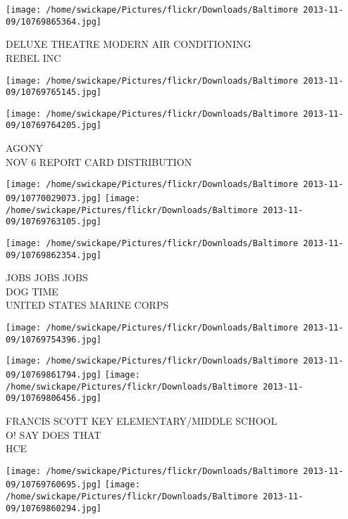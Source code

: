 \documentclass[10pt,letterpaper]{article}
\begin{document}
\vspace{0.25in}
\texttt{[image: /home/swickape/Pictures/flickr/Downloads/Baltimore 2013-11-09/10769865364.jpg]}

DELUXE THEATRE MODERN AIR CONDITIONING\\
REBEL INC\\
\pagebreak

\texttt{[image: /home/swickape/Pictures/flickr/Downloads/Baltimore 2013-11-09/10769765145.jpg]}

\vspace{0.25in}
\texttt{[image: /home/swickape/Pictures/flickr/Downloads/Baltimore 2013-11-09/10769764205.jpg]}

AGONY\\
NOV 6 REPORT CARD DISTRIBUTION\\
\pagebreak

\texttt{[image: /home/swickape/Pictures/flickr/Downloads/Baltimore 2013-11-09/10770029073.jpg]}
\texttt{[image: /home/swickape/Pictures/flickr/Downloads/Baltimore 2013-11-09/10769763105.jpg]}

\vspace{0.25in}
\texttt{[image: /home/swickape/Pictures/flickr/Downloads/Baltimore 2013-11-09/10769862354.jpg]}

JOBS JOBS JOBS\\
DOG TIME\\
UNITED STATES MARINE CORPS\\
\pagebreak

\texttt{[image: /home/swickape/Pictures/flickr/Downloads/Baltimore 2013-11-09/10769754396.jpg]}

\vspace{0.25in}
\texttt{[image: /home/swickape/Pictures/flickr/Downloads/Baltimore 2013-11-09/10769861794.jpg]}
\texttt{[image: /home/swickape/Pictures/flickr/Downloads/Baltimore 2013-11-09/10769806456.jpg]}

FRANCIS SCOTT KEY ELEMENTARY/MIDDLE SCHOOL\\
O! SAY DOES THAT\\
HCE\\
\pagebreak

\texttt{[image: /home/swickape/Pictures/flickr/Downloads/Baltimore 2013-11-09/10769760695.jpg]}
\texttt{[image: /home/swickape/Pictures/flickr/Downloads/Baltimore 2013-11-09/10769860294.jpg]}
\end{document}

